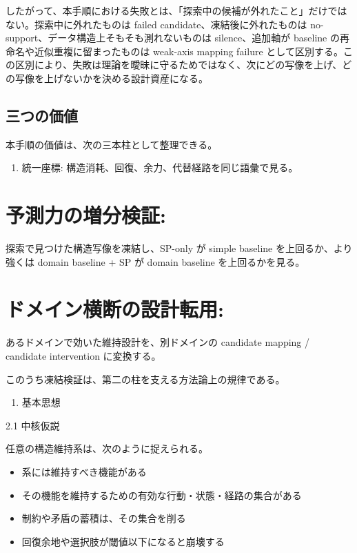\documentclass[12pt,a4paper]{article}
\begin{document}
したがって、本手順における失敗とは、「探索中の候補が外れたこと」だけではない。探索中に外れたものは failed candidate、凍結後に外れたものは no-support、データ構造上そもそも測れないものは silence、追加軸が baseline の再命名や近似重複に留まったものは weak-axis mapping failure として区別する。この区別により、失敗は理論を曖昧に守るためではなく、次にどの写像を上げ、どの写像を上げないかを決める設計資産になる。

\subsection{三つの価値}\label{ux4e09ux3064ux306eux4fa1ux5024}

本手順の価値は、次の三本柱として整理できる。

\begin{enumerate}
\def\labelenumi{\arabic{enumi}.}
\tightlist
\item
  統一座標: 構造消耗、回復、余力、代替経路を同じ語彙で見る。
\end{enumerate}

\section{予測力の増分検証:}\label{ux4e88ux6e2cux529bux306eux5897ux5206ux691cux8a3c}

探索で見つけた構造写像を凍結し、SP-only が simple baseline を上回るか、より強くは domain baseline + SP が domain baseline を上回るかを見る。

\section{ドメイン横断の設計転用:}\label{ux30c9ux30e1ux30a4ux30f3ux6a2aux65adux306eux8a2dux8a08ux8ee2ux7528}

あるドメインで効いた維持設計を、別ドメインの candidate mapping / candidate intervention に変換する。

このうち凍結検証は、第二の柱を支える方法論上の規律である。

\begin{enumerate}
\def\labelenumi{\arabic{enumi}.}
\setcounter{enumi}{1}
\tightlist
\item
  基本思想
\end{enumerate}

2.1 中核仮説

任意の構造維持系は、次のように捉えられる。

\begin{itemize}
\tightlist
\item
  系には維持すべき機能がある
\item
  その機能を維持するための有効な行動・状態・経路の集合がある
\item
  制約や矛盾の蓄積は、その集合を削る
\item
  回復余地や選択肢が閾値以下になると崩壊する
\end{itemize}
\end{document}
